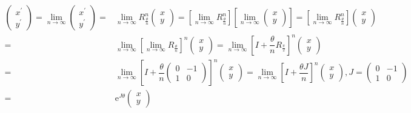 \documentclass[
]{book}
\theoremstyle{definition}
\theoremstyle{definition}
\theoremstyle{definition}
\theoremstyle{definition}
\theoremstyle{remark}
\begin{document}
\[
\begin{aligned}
\begin{pmatrix}x^{\prime}\\
y^{\prime}
\end{pmatrix}=\lim_{n\rightarrow\infty}\begin{pmatrix}x^{\prime}\\
y^{\prime}
\end{pmatrix}= & \lim_{n\rightarrow\infty}R_{{\scriptscriptstyle \frac{\theta}{n}}}^{n}\begin{pmatrix}x\\
y
\end{pmatrix}=\left[\lim_{n\rightarrow\infty}R_{{\scriptscriptstyle \frac{\theta}{n}}}^{n}\right]\left[\lim_{n\rightarrow\infty}\begin{pmatrix}x\\
y
\end{pmatrix}\right]=\left[\lim_{n\rightarrow\infty}R_{{\scriptscriptstyle \frac{\theta}{n}}}^{n}\right]\begin{pmatrix}x\\
y
\end{pmatrix}\\
= & \lim_{n\rightarrow\infty}\left[\lim_{n\rightarrow\infty}R_{{\scriptscriptstyle \frac{\theta}{n}}}\right]^{n}\begin{pmatrix}x\\
y
\end{pmatrix}=\lim_{n\rightarrow\infty}\left[I+\dfrac{\theta}{n}R_{{\scriptscriptstyle \frac{\pi}{2}}}\right]^{n}\begin{pmatrix}x\\
y
\end{pmatrix}\\
= & \lim_{n\rightarrow\infty}\left[I+\dfrac{\theta}{n}\begin{pmatrix}0 & -1\\
1 & 0
\end{pmatrix}\right]^{n}\begin{pmatrix}x\\
y
\end{pmatrix}=\lim_{n\rightarrow\infty}\left[I+\dfrac{\theta J}{n}\right]^{n}\begin{pmatrix}x\\
y
\end{pmatrix},J=\begin{pmatrix}0 & -1\\
1 & 0
\end{pmatrix}\\
= & \mathrm{e}^{J\theta}\begin{pmatrix}x\\
y
\end{pmatrix}
\end{aligned}
\]
\end{document}

